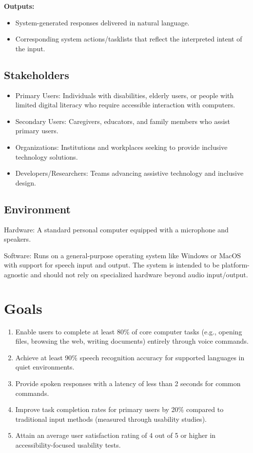 \documentclass{article}
\begin{document}
\textbf{Outputs:}
\begin{itemize}
    \item System-generated responses delivered in natural language.
    \item Corresponding system actions/tasklists that reflect the interpreted intent of the input.
\end{itemize}

\subsection{Stakeholders}
\begin{itemize}
    \item Primary Users: Individuals with disabilities, elderly users, or people with limited digital literacy who require accessible interaction with computers.
    \item Secondary Users: Caregivers, educators, and family members who assist primary users.
    \item Organizations: Institutions and workplaces seeking to provide inclusive technology solutions.
    \item Developers/Researchers: Teams advancing assistive technology and inclusive design.
\end{itemize}
\subsection{Environment}
Hardware: A standard personal computer equipped with a microphone and speakers.

Software: Runs on a general-purpose operating system like Windows or MacOS with support for speech input and output. The system is intended to be platform-agnostic and should not rely on specialized hardware beyond audio input/output.

\section{Goals}
\begin{enumerate}
    \item Enable users to complete at least 80\% of core computer tasks (e.g., opening files, browsing the web, writing documents) entirely through voice commands.
    \item Achieve at least 90\% speech recognition accuracy for supported languages in quiet environments.
    \item Provide spoken responses with a latency of less than 2 seconds for common commands.
    \item Improve task completion rates for primary users by 20\% compared to traditional input methods (measured through usability studies).
    \item Attain an average user satisfaction rating of 4 out of 5 or higher in accessibility-focused usability tests.
\end{enumerate}
\end{document}
